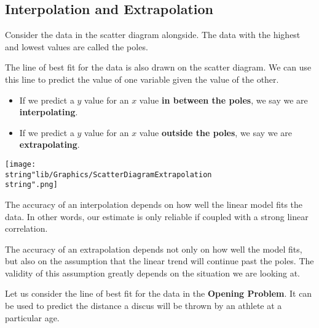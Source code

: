 \documentclass[11pt,a4paper]{book}
\begin{document}
\subsection{Interpolation and Extrapolation}

Consider the data in the scatter diagram alongside. The data with
the highest and lowest values are called the poles.

\begin{minipage}[t]{.5\textwidth}

The line of best fit for the data is also drawn on the scatter diagram.
We can use this line to predict the value of one variable given the
value of the other.
\begin{itemize}
\item If we predict a $y$ value for an $x$ value \textbf{in between the
poles}, we say we are \textbf{interpolating}.
\item If we predict a $y$ value for an $x$ value \textbf{outside the poles},
we say we are \textbf{extrapolating}.
\end{itemize}
\end{minipage}
\begin{minipage}[t]{.5\textwidth}
\begin{center}
\texttt{[image: \\string"lib/Graphics/ScatterDiagramExtrapolation\\string".png]}
\par\end{center}

\end{minipage}

The accuracy of an interpolation depends on how well the linear model
fits the data. In other words, our estimate is only reliable if coupled
with a strong linear correlation.

The accuracy of an extrapolation depends not only on how well the
model fits, but also on the assumption that the linear trend will
continue past the poles. The validity of this assumption greatly depends
on the situation we are looking at.

Let us consider the line of best fit for the data in the \textbf{Opening
Problem}. It can be used to predict the distance a discus will be
thrown by an athlete at a particular age.
\end{document}
